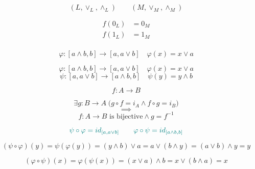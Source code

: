 \begin{frame}{}
  \centerline{} 

  \[
    (L, \lor_{L}, \land_{L})  \qquad (M, \lor_{M}, \land_{M})
  \]

  \pause
  \begin{align*}
   f(0_L) &= 0_M \\
   f(1_L) &= 1_M \\
  \end{align*}
\end{frame}

\begin{frame}{}
  \centerline{}

  \[
    \varphi: [a \land b, b] \to [a, a \lor b]  \quad \varphi(x) = x \lor a
  \]

\end{frame}

\begin{frame}{}
  \[
    \varphi: [a \land b, b] \to [a, a \lor b]  \quad \varphi(x) = x \lor a
  \]
  \[
    \psi: [a, a \lor b] \to [a \land b, b] \quad \psi(y) = y \land b
  \]

  \vspace{0.30cm}
  \centerline{}

  \pause
  \vspace{0.30cm}
  \begin{theorem}
    \[
      f: A \to B
    \]

    \[
      \exists g: B \to A\; \Big( g \circ f = i_A \land f \circ g = i_B \Big) 
    \]
    \[ 
      \implies 
    \]
    \[
      f: A \to B \text{ is bijective} \land g = f^{-1}
    \]
  \end{theorem}
\end{frame}

\begin{frame}{}
  \[
    \textcolor{teal}{\psi \circ \varphi = id_{[a, a \lor b]} \qquad \varphi \circ \psi = id_{[a \land b, b]}}
  \]

  \pause
  \[
    (\psi \circ \varphi) (y) = \psi(\varphi(y)) = (y \land b) \lor a = a \lor (b \land y) = (a \lor b) \land y = y
  \]

  \pause
  \[
    (\varphi \circ \psi) (x) = \varphi(\psi(x)) = (x \lor a) \land b = x \lor (b \land a) = x
  \]
\end{frame}
